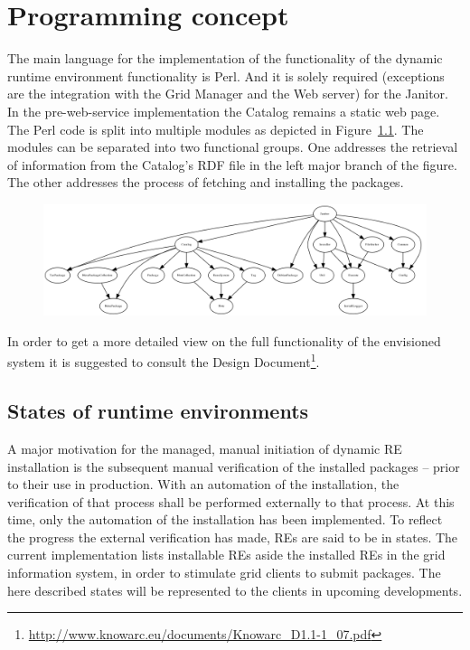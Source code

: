 \chapter{Programming concept}

 The main language for the implementation of the functionality of the
 dynamic runtime environment functionality is Perl. And it is solely required (exceptions are the
 integration with the Grid Manager and the Web server) for the Janitor. In
 the pre-web-service implementation the Catalog remains a static web page.
 The Perl code is split into multiple modules as depicted in Figure~\ref{fig:janitorDependencies}. 
 The modules can be separated into two
 functional groups. One addresses the retrieval of information from
 the Catalog's RDF file in the left major branch of the figure. The other
 addresses the process of fetching and installing the packages.

 \begin{landscape}
\begin{figure}[!h]
\vspace{4cm}
 \begin{center} 
    \includegraphics[width=24cm]{images/dependencies.png}
 \end{center} 
\vfill
 \label{fig:janitorDependencies} 
\end{figure}
 \end{landscape}

In order to get a more detailed view on the full functionality of the envisioned system it is suggested to consult the 
Design Document\footnote{\href{http://www.knowarc.eu/documents/Knowarc_D1.1-1_07.pdf}
{http://www.knowarc.eu/documents/Knowarc\_D1.1-1\_07.pdf}}.




\section{States of runtime environments}
A major motivation for the managed, manual initiation of dynamic RE
installation is the subsequent manual verification of the installed
packages -- prior to their use in production.
With an automation of the installation, the verification of
that process shall be performed externally to that process.  At this
time, only the automation of the installation has been implemented.
To reflect the progress the external verification has made, REs
are said to be in states. The current implementation lists
installable REs aside the installed REs in the grid information system,
in order to stimulate grid clients to submit packages. The here described
states will be represented to the clients in upcoming developments.

